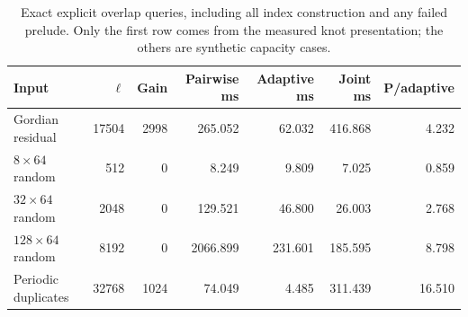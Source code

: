 \begin{table}[htbp]
\centering\small
\setlength{\tabcolsep}{4pt}
\begin{tabular}{@{}lrrrrrr@{}}
\toprule
Input & $\ell$ & Gain & Pairwise ms & Adaptive ms & Joint ms & P/adaptive\\\midrule
Gordian residual & 17504 & 2998 & 265.052 & 62.032 & 416.868 & 4.232\\
$8\times64$ random & 512 & 0 & 8.249 & 9.809 & 7.025 & 0.859\\
$32\times64$ random & 2048 & 0 & 129.521 & 46.800 & 26.003 & 2.768\\
$128\times64$ random & 8192 & 0 & 2066.899 & 231.601 & 185.595 & 8.798\\
Periodic duplicates & 32768 & 1024 & 74.049 & 4.485 & 311.439 & 16.510\\
\bottomrule
\end{tabular}
\caption{Exact explicit overlap queries, including all index construction and any failed prelude. Only the first row comes from the measured knot presentation; the others are synthetic capacity cases.}
\label{tab:overlap_kernels}
\end{table}
